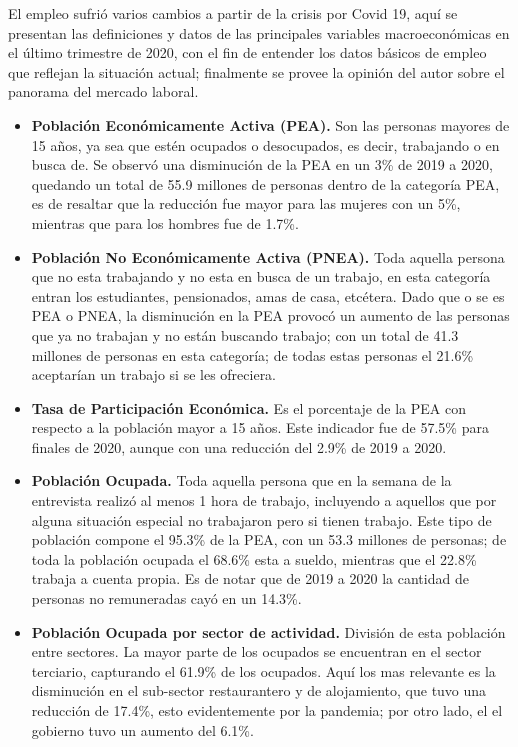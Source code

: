 
El empleo sufrió varios cambios a partir de la crisis por Covid 19, aquí se presentan las definiciones y datos de las principales variables macroeconómicas en el último trimestre de 2020, con el fin de entender los datos básicos de empleo que reflejan la situación actual; finalmente se provee la opinión del autor sobre el panorama del mercado laboral.

\begin{itemize}
    \item \textbf{Población Económicamente Activa (PEA).} Son las personas mayores de 15 años, ya sea que estén ocupados o desocupados, es decir, trabajando o en busca de. Se observó una disminución de la PEA en un 3\% de 2019 a 2020, quedando un total de 55.9 millones de personas dentro de la categoría PEA, es de resaltar que la reducción fue mayor para las mujeres con un 5\%, mientras que para los hombres fue de 1.7\%.
    \item \textbf{Población No Económicamente Activa (PNEA).} Toda aquella persona que no esta trabajando y no esta en busca de un trabajo, en esta categoría entran los estudiantes, pensionados, amas de casa, etcétera. Dado que o se es PEA o PNEA, la disminución en la PEA provocó un aumento de las personas que ya no trabajan y no están buscando trabajo; con un total de 41.3 millones de personas en esta categoría; de todas estas personas el 21.6\% aceptarían un trabajo si se les ofreciera.
    \item \textbf{Tasa de Participación Económica.} Es el porcentaje de la PEA con respecto a la población mayor a 15 años. Este indicador fue de 57.5\% para finales de 2020, aunque con una reducción del 2.9\% de 2019 a 2020.
    \item \textbf{Población Ocupada.} Toda aquella persona que en la semana de la entrevista realizó al menos 1 hora de trabajo, incluyendo a aquellos que por alguna situación especial no trabajaron pero si tienen trabajo. Este tipo de población compone el 95.3\% de la PEA, con un 53.3 millones de personas; de toda la población ocupada el 68.6\% esta a sueldo, mientras que el 22.8\% trabaja a cuenta propia. Es de notar que de 2019 a 2020 la cantidad de personas no remuneradas cayó en un 14.3\%.
    \item \textbf{Población Ocupada por sector de actividad.} División de esta población entre sectores. La mayor parte de los ocupados se encuentran en el sector terciario, capturando el 61.9\% de los ocupados. Aquí los mas relevante es la disminución en el sub-sector restaurantero y de alojamiento, que tuvo una reducción de 17.4\%, esto evidentemente por la pandemia; por otro lado, el el gobierno tuvo un aumento del 6.1\%.

\end{itemize}

